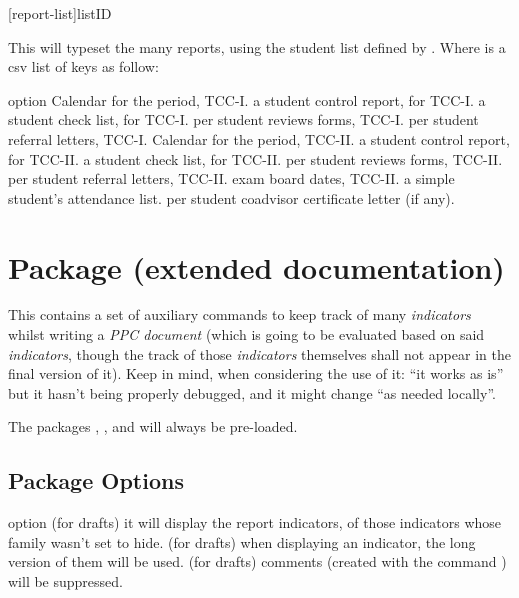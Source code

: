 \documentclass[article,nogeometry,english,tocdepth=3,secdepth=3]{ufrgscca} %
\begin{document}
 
\begin{codedescribe}{\tcreports}
	\begin{codesyntax}%
		\tsmacro{\tcreports}[report-list]{listID}
	\end{codesyntax}
	This will typeset the many reports, using the student list defined by .
    Where  is a csv list of keys as follow:
\end{codedescribe}

\begin{describelist}{option}
	 { Calendar for the period, TCC-I.}
	 { a student control report, for TCC-I.}
	 { a student check list, for TCC-I.}
	 { per student reviews forms, TCC-I.}
	 { per student referral letters, TCC-I.}
	 { Calendar for the period, TCC-II.}
	 { a student control report, for TCC-II.}
	 { a student check list, for TCC-II.}
	 { per student reviews forms, TCC-II.}
	 { per student referral letters, TCC-II.}
	 { exam board dates, TCC-II.}
	 { a simple student's attendance list.}
	 { per student coadvisor certificate letter (if any).}
\end{describelist}


\section{ Package (extended documentation)}
This contains a set of auxiliary commands to keep track of many \emph{indicators} whilst writing  a \emph{PPC document} (which is going to be evaluated based on said \emph{indicators}, though the track of those \emph{indicators} themselves shall not appear in the final version of it). Keep in mind, when considering the use of it: “it works as is” but it hasn't being properly debugged, and it might change “as needed locally”.

The packages , ,  and  will always be pre-loaded.

\subsection{Package Options}
\begin{describelist}{option}
 { (for drafts) it will display the report indicators, of those indicators whose family wasn't set to hide.}
 { (for drafts) when displaying an indicator, the long version of them will be used.}
 { (for drafts) comments (created with the command \tsmacro{\comment}) will be suppressed.}
\end{describelist}
\end{document}
